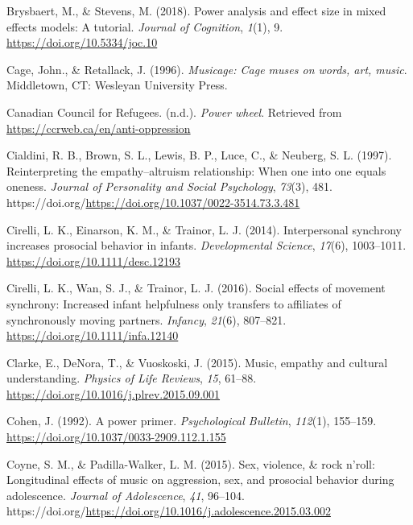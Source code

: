 \documentclass[
  man,floatsintext]{apa6}
\newlength{\cslhangindent}
\newenvironment{CSLReferences}[2] %
 {\begin{list}{}{%
  \setlength{\itemindent}{0pt}
  \setlength{\leftmargin}{0pt}
  \setlength{\parsep}{0pt}
  \ifodd #1
   \setlength{\leftmargin}{\cslhangindent}
   \setlength{\itemindent}{-1\cslhangindent}
  \fi
  \setlength{\itemsep}{#2\baselineskip}}}
 {\end{list}}
\begin{document}
\begin{CSLReferences}{1}{0}
Brysbaert, M., \& Stevens, M. (2018). Power analysis and effect size in mixed effects models: {A} tutorial. \emph{Journal of Cognition}, \emph{1}(1), 9. \url{https://doi.org/10.5334/joc.10}

Cage, John., \& Retallack, J. (1996). \emph{Musicage: {Cage} muses on words, art, music}. Middletown, CT: Wesleyan University Press.

Canadian Council for Refugees. (n.d.). \emph{Power wheel}. Retrieved from \url{https://ccrweb.ca/en/anti-oppression}

Cialdini, R. B., Brown, S. L., Lewis, B. P., Luce, C., \& Neuberg, S. L. (1997). Reinterpreting the empathy--altruism relationship: {When} one into one equals oneness. \emph{Journal of Personality and Social Psychology}, \emph{73}(3), 481. https://doi.org/\url{https://doi.org/10.1037/0022-3514.73.3.481}

Cirelli, L. K., Einarson, K. M., \& Trainor, L. J. (2014). Interpersonal synchrony increases prosocial behavior in infants. \emph{Developmental Science}, \emph{17}(6), 1003--1011. \url{https://doi.org/10.1111/desc.12193}

Cirelli, L. K., Wan, S. J., \& Trainor, L. J. (2016). Social effects of movement synchrony: {Increased} infant helpfulness only transfers to affiliates of synchronously moving partners. \emph{Infancy}, \emph{21}(6), 807--821. \url{https://doi.org/10.1111/infa.12140}

Clarke, E., DeNora, T., \& Vuoskoski, J. (2015). Music, empathy and cultural understanding. \emph{Physics of Life Reviews}, \emph{15}, 61--88. \url{https://doi.org/10.1016/j.plrev.2015.09.001}

Cohen, J. (1992). A power primer. \emph{Psychological Bulletin}, \emph{112}(1), 155--159. \url{https://doi.org/10.1037/0033-2909.112.1.155}

Coyne, S. M., \& Padilla-Walker, L. M. (2015). Sex, violence, \& rock n'roll: {Longitudinal} effects of music on aggression, sex, and prosocial behavior during adolescence. \emph{Journal of Adolescence}, \emph{41}, 96--104. https://doi.org/\url{https://doi.org/10.1016/j.adolescence.2015.03.002}


\end{CSLReferences}
\end{document}
